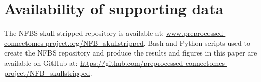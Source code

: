 \section*{Availability of supporting data}
The NFBS skull-stripped repository is available at: \url{www.preprocessed-connectomes-project.org/NFB\_skullstripped}. Bash and Python scripts used to create the NFBS repository and produce the results and figures in this paper are available on GitHub at: \url{https://github.com/preprocessed-connectomes-project/NFB\_skullstripped}\DIFaddbegin {}\cite{puccio2016}\DIFaddend .
